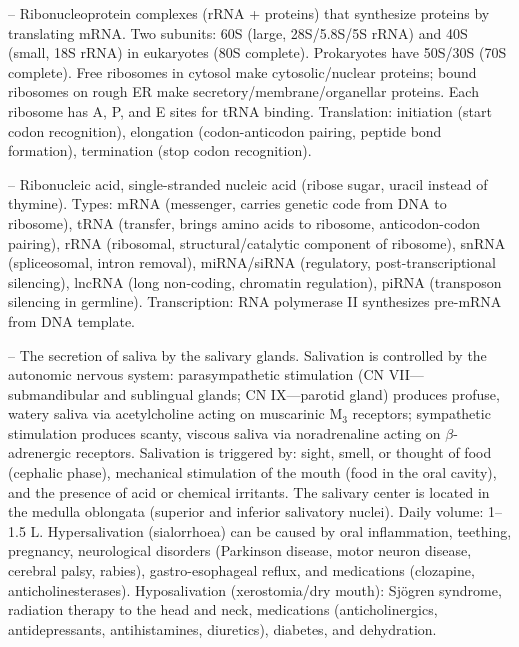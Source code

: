 -- Ribonucleoprotein complexes (rRNA + proteins) that synthesize proteins by translating mRNA. Two subunits: 60S (large, 28S/5.8S/5S rRNA) and 40S (small, 18S rRNA) in eukaryotes (80S complete). Prokaryotes have 50S/30S (70S complete). Free ribosomes in cytosol make cytosolic/nuclear proteins; bound ribosomes on rough ER make secretory/membrane/organellar proteins. Each ribosome has A, P, and E sites for tRNA binding. Translation: initiation (start codon recognition), elongation (codon-anticodon pairing, peptide bond formation), termination (stop codon recognition).

-- Ribonucleic acid, single-stranded nucleic acid (ribose sugar, uracil instead of thymine). Types: mRNA (messenger, carries genetic code from DNA to ribosome), tRNA (transfer, brings amino acids to ribosome, anticodon-codon pairing), rRNA (ribosomal, structural/catalytic component of ribosome), snRNA (spliceosomal, intron removal), miRNA/siRNA (regulatory, post-transcriptional silencing), lncRNA (long non-coding, chromatin regulation), piRNA (transposon silencing in germline). Transcription: RNA polymerase II synthesizes pre-mRNA from DNA template.

-- The secretion of saliva by the salivary glands. Salivation is controlled by the autonomic nervous system: parasympathetic stimulation (CN VII—submandibular and sublingual glands; CN IX—parotid gland) produces profuse, watery saliva via acetylcholine acting on muscarinic M$_3$ receptors; sympathetic stimulation produces scanty, viscous saliva via noradrenaline acting on $\beta$-adrenergic receptors. Salivation is triggered by: sight, smell, or thought of food (cephalic phase), mechanical stimulation of the mouth (food in the oral cavity), and the presence of acid or chemical irritants. The salivary center is located in the medulla oblongata (superior and inferior salivatory nuclei). Daily volume: 1--1.5 L. Hypersalivation (sialorrhoea) can be caused by oral inflammation, teething, pregnancy, neurological disorders (Parkinson disease, motor neuron disease, cerebral palsy, rabies), gastro-esophageal reflux, and medications (clozapine, anticholinesterases). Hyposalivation (xerostomia/dry mouth): Sjögren syndrome, radiation therapy to the head and neck, medications (anticholinergics, antidepressants, antihistamines, diuretics), diabetes, and dehydration.

